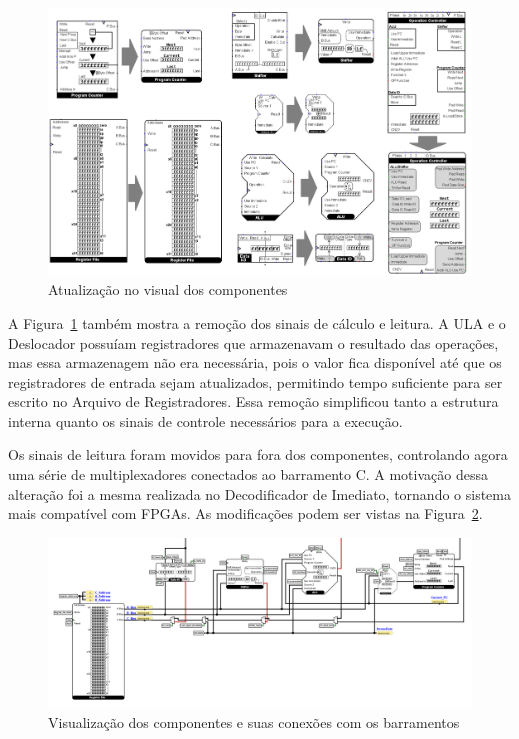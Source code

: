 \documentclass[
	12pt,				%
	openright,			%
	oneside,			%
	a4paper,			%
	english,			%
	french,				%
	spanish,			%
	brazil,				%
	]{abntex2}
\begin{document}
\begin{figure}[ht]
    \centering
    \includegraphics[width=1\linewidth]{ProcessoDesenvolvimento/Arquitetura/ComponentsVisualUpdate.png}
    \caption{Atualização no visual dos componentes}
    \label{fig:AtualizacaoVisual}
\end{figure}

A Figura~\ref{fig:AtualizacaoVisual} também mostra a remoção dos sinais de cálculo e leitura. A ULA e o Deslocador possuíam registradores que armazenavam o resultado das operações, mas essa armazenagem não era necessária, pois o valor fica disponível até que os registradores de entrada sejam atualizados, permitindo tempo suficiente para ser escrito no Arquivo de Registradores. Essa remoção simplificou tanto a estrutura interna quanto os sinais de controle necessários para a execução.

Os sinais de leitura foram movidos para fora dos componentes, controlando agora uma série de multiplexadores conectados ao barramento C. A motivação dessa alteração foi a mesma realizada no Decodificador de Imediato, tornando o sistema mais compatível com FPGAs. As modificações podem ser vistas na Figura~\ref{fig:Arquitetura3}.

\begin{figure}[ht]
    \centering
    \includegraphics[width=1\linewidth]{ProcessoDesenvolvimento/Arquitetura/Arquitetura3.png}
    \caption{Visualização dos componentes e suas conexões com os barramentos}
    \label{fig:Arquitetura3}
\end{figure}
\end{document}
